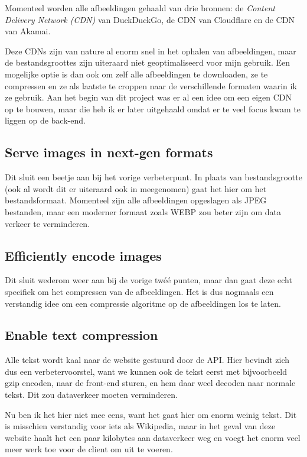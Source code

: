 \documentclass[a4paper]{report}
\begin{document}
    Momenteel worden alle afbeeldingen gehaald van drie bronnen: de \textit{Content Delivery Network (CDN)} van DuckDuckGo,
    de CDN van Cloudflare en de CDN van Akamai.

    Deze CDNs zijn van nature al enorm snel in het ophalen van afbeeldingen, maar de bestandsgroottes zijn uiteraard niet geoptimaliseerd voor mijn gebruik.
    Een mogelijke optie is dan ook om zelf alle afbeeldingen te downloaden, ze te compressen en ze als laatste te croppen naar de verschillende formaten waarin ik ze gebruik.
    Aan het begin van dit project was er al een idee om een eigen CDN op te bouwen, maar die heb ik er later uitgehaald omdat er te veel focus kwam te liggen op de back-end.

    \subsection{Serve images in next-gen formats}
    Dit sluit een beetje aan bij het vorige verbeterpunt. In plaats van bestandsgrootte (ook al wordt dit er uiteraard ook in meegenomen) gaat het hier om het bestandsformaat.
    Momenteel zijn alle afbeeldingen opgeslagen als JPEG bestanden, maar een moderner formaat zoals WEBP zou beter zijn om data verkeer te verminderen.

    \subsection{Efficiently encode images}
    Dit sluit wederom weer aan bij de vorige twéé punten, maar dan gaat deze echt specifiek om het compressen van de afbeeldingen.
    Het is dus nogmaals een verstandig idee om een compressie algoritme op de afbeeldingen los te laten.

    \subsection{Enable text compression}
    Alle tekst wordt kaal naar de website gestuurd door de API. Hier bevindt zich dus een verbetervoorstel, want we kunnen ook de tekst eerst met bijvoorbeeld
    {\selectfont gzip} encoden, naar de front-end sturen, en hem daar weel decoden naar normale tekst. Dit zou dataverkeer moeten verminderen.

    Nu ben ik het hier niet mee eens, want het gaat hier om enorm weinig tekst. Dit is misschien verstandig voor iets als Wikipedia, maar in het geval van deze website
    haalt het een paar kilobytes aan dataverkeer weg en voegt het enorm veel meer werk toe voor de client om uit te voeren.
\end{document}
